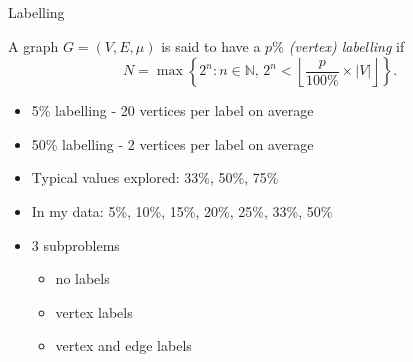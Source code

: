 \documentclass{beamer}
\begin{document}
\begin{frame}{Labelling}
  \begin{definition}
    A graph $G = (V, E, \mu)$ is said to have a \emph{$p\%$ (vertex) labelling} if
    \[ N = \max \left\{ 2^n : n \in \mathbb{N},\, 2^n < \left\lfloor \frac{p}{100\%}
          \times |V| \right\rfloor \right\}. \]
  \end{definition}
  \begin{itemize}
  \item 5\% labelling - 20 vertices per label on average
  \item 50\% labelling - 2 vertices per label on average
    \pause
  \item Typical values explored: 33\%, 50\%, 75\%
    \pause
  \item In my data: 5\%, 10\%, 15\%, 20\%, 25\%, 33\%, 50\%
    \pause
  \item 3 subproblems
    \begin{itemize}
    \item no labels
    \item vertex labels
    \item vertex and edge labels
    \end{itemize}
  \end{itemize}
\end{frame}

\end{document}
